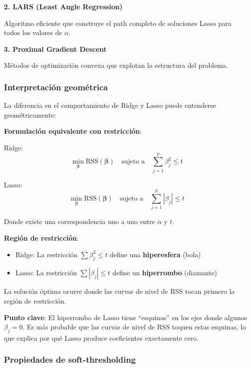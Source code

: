\documentclass[
  doc,
  floatsintext,
  longtable,
  a4paper,
  nolmodern,
  notxfonts,
  notimes,
  12pt,
  colorlinks=true,linkcolor=blue,citecolor=blue,urlcolor=blue]{apa7}
\providecommand{\tightlist}{%
  \setlength{\itemsep}{0pt}\setlength{\parskip}{0pt}}
\begin{document}
\textbf{2. LARS (Least Angle Regression)}

Algoritmo eficiente que construye el path completo de soluciones Lasso
para todos los valores de \(\alpha\).

\textbf{3. Proximal Gradient Descent}

Métodos de optimización convexa que explotan la estructura del problema.

\subsubsection{Interpretación
geométrica}\label{interpretaciuxf3n-geomuxe9trica-1}

La diferencia en el comportamiento de Ridge y Lasso puede entenderse
geométricamente:

\textbf{Formulación equivalente con restricción}:

Ridge: \[
\min_{\boldsymbol{\beta}} \text{RSS}(\boldsymbol{\beta}) \quad \text{sujeto a} \quad \sum_{j=1}^{p} \beta_j^2 \leq t
\]

Lasso: \[
\min_{\boldsymbol{\beta}} \text{RSS}(\boldsymbol{\beta}) \quad \text{sujeto a} \quad \sum_{j=1}^{p} |\beta_j| \leq t
\]

Donde existe una correspondencia uno a uno entre \(\alpha\) y \(t\).

\textbf{Región de restricción}:

\begin{itemize}
\tightlist
\item
  Ridge: La restricción \(\sum \beta_j^2 \leq t\) define una
  \textbf{hiperesfera} (bola)
\item
  Lasso: La restricción \(\sum |\beta_j| \leq t\) define un
  \textbf{hiperrombo} (diamante)
\end{itemize}

La solución óptima ocurre donde las curvas de nivel de RSS tocan primero
la región de restricción.

\textbf{Punto clave}: El hiperrombo de Lasso tiene ``esquinas'' en los
ejes donde algunos \(\beta_j = 0\). Es más probable que las curvas de
nivel de RSS toquen estas esquinas, lo que explica por qué Lasso produce
coeficientes exactamente cero.

\subsubsection{Propiedades de
soft-thresholding}\label{propiedades-de-soft-thresholding}
\end{document}
